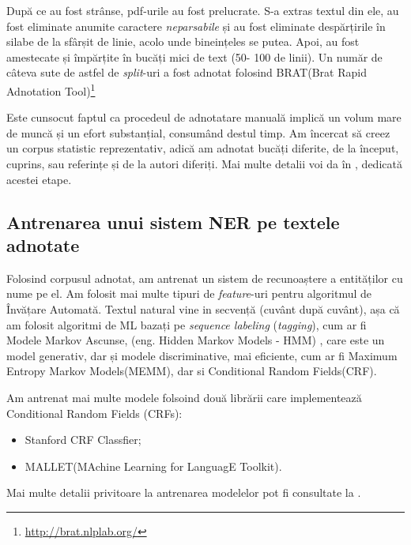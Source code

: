 După ce au fost strânse, pdf-urile au fost prelucrate. S-a extras textul din ele, au fost eliminate anumite caractere \textit{neparsabile} și au fost eliminate despărțirile în silabe de la sfârșit de linie, acolo unde bineințeles se putea. Apoi, au fost amestecate și împărțite în bucăți mici de text (50- 100 de linii). Un număr de câteva sute de astfel de \textit{split}-uri a fost adnotat folosind BRAT(Brat Rapid Adnotation Tool)\footnote{\url{http://brat.nlplab.org/}}

Este cunsocut faptul ca procedeul de adnotatare manuală implică un volum mare de muncă și un efort substanțial, consumând destul timp. Am încercat să creez un corpus statistic reprezentativ, adică am adnotat bucăți diferite, de la început, cuprins, sau referințe și de la autori diferiți. Mai multe detalii voi da în , dedicată acestei etape.

\subsection{Antrenarea unui sistem NER pe textele adnotate}


Folosind corpusul adnotat, am antrenat un sistem de recunoaștere a entităților cu nume pe el. Am folosit mai multe tipuri de \textit{feature}-uri pentru algoritmul de Învățare Automată. Textul natural vine in secvență (cuvânt după cuvânt), așa că am folosit algoritmi de ML bazați pe \textit{sequence labeling} (\textit{tagging}), cum ar fi Modele Markov Ascunse, (eng. Hidden Markov Models - HMM) , care este un model generativ, dar și modele discriminative, mai eficiente, cum ar fi Maximum Entropy Markov Models(MEMM), dar si Conditional Random Fields(CRF).

Am antrenat mai multe modele folsoind două librării care implementează Conditional Random Fields (CRFs):
\begin{itemize}
\item Stanford CRF Classfier;
\item MALLET(MAchine Learning for LanguagE Toolkit).
\end{itemize}

Mai multe detalii privitoare la antrenarea modelelor pot fi consultate la .


